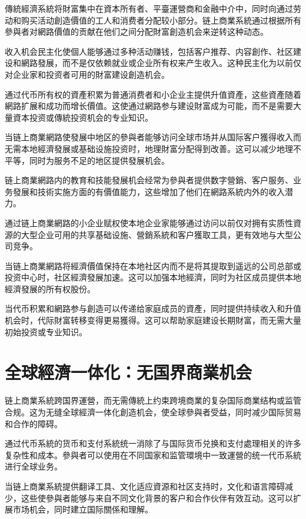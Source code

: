 \documentclass[
  Letterpaper,
]{scrbook}
\begin{document}
傳統經濟系統将財富集中在資本所有者、平臺運營商和金融中介中，同时向通过劳动和购买活动創造價值的工人和消费者分配较小部分。链上商業系統通过根据所有參與者对網路價值的贡献在他们之间分配財富創造机会来逆转这种动态。

收入机会民主化使個人能够通过多种活动赚钱，包括客户推荐、内容創作、社区建设和網路發展，而不是仅依赖就业或企业所有权来产生收入。这种民主化为以前仅对企业家和投资者可用的財富建设創造机会。

通过代币所有权的資產积累为普通消费者和小企业主提供升值資產，这些資產随着網路扩展和成功而增长價值。这使通过網路参与建设財富成为可能，而不是需要大量資本投资或傳統投资机会的专业知识。

当链上商業網路使發展中地区的參與者能够访问全球市场并从国际客户獲得收入而无需本地經濟發展或基础设施投资时，地理財富分配得到改善。这可以减少地理不平等，同时为服务不足的地区提供發展机会。

链上商業網路内的教育和技能發展机会经常为參與者提供数字營銷、客户服务、业务發展和技術实施方面的有價值能力，这些增加了他们在網路系統内外的收入潜力。

通过链上商業網路的小企业赋权使本地企业家能够通过访问以前仅对拥有实质性資源的大型企业可用的共享基础设施、營銷系統和客户獲取工具，更有效地与大型公司竞争。

当链上商業網路将經濟價值保持在本地社区内而不是将其提取到遥远的公司总部或投资中心时，社区經濟發展加速。这可以加强本地經濟，同时为社区成员提供本地經濟發展的所有权股份。

当代币积累和網路参与創造可以传递给家庭成员的資產，同时提供持续收入和升值机会时，代际財富转移变得更易獲得。这可以帮助家庭建设长期財富，而无需大量初始投资或专业知识。

\section{全球經濟一体化：无国界商業机会}\label{ux5168ux7403ux7d93ux6fdfux4e00ux4f53ux5316ux65e0ux56fdux754cux5546ux696dux673aux4f1a}

链上商業系統跨国界運營，而无需傳統上约束跨境商業的复杂国际商業结构或监管合规。这为无缝全球經濟一体化創造机会，使全球參與者受益，同时减少国际贸易和合作的障碍。

通过代币系統的货币和支付系統统一消除了与国际货币兑换和支付處理相关的许多复杂性和成本。參與者可以使用在不同国家和监管環境中一致運營的统一代币系統进行全球业务。

当链上商業系統提供翻译工具、文化适应資源和社区支持时，文化和语言障碍减少，这些使參與者能够与来自不同文化背景的客户和合作伙伴有效互动。这可以扩展市场机会，同时建立国际關係和理解。
\end{document}
